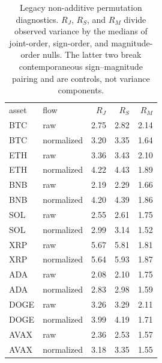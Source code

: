 \begin{table}[!htbp]
\caption{Legacy non-additive permutation diagnostics. $R_J$, $R_S$, and $R_M$ divide observed variance by the medians of joint-order, sign-order, and magnitude-order nulls. The latter two break contemporaneous sign--magnitude pairing and are controls, not variance components.}
\label{tab:permutation-controls}
\begin{ruledtabular}
\begin{tabular}{llrrr}
asset & flow & $R_J$ & $R_S$ & $R_M$ \\
\colrule
BTC & raw & 2.75 & 2.82 & 2.14 \\
BTC & normalized & 3.20 & 3.35 & 1.64 \\
ETH & raw & 3.36 & 3.43 & 2.10 \\
ETH & normalized & 4.22 & 4.43 & 1.89 \\
BNB & raw & 2.19 & 2.29 & 1.66 \\
BNB & normalized & 4.20 & 4.39 & 1.86 \\
SOL & raw & 2.55 & 2.61 & 1.75 \\
SOL & normalized & 2.99 & 3.14 & 1.52 \\
\colrule
XRP & raw & 5.67 & 5.81 & 1.81 \\
XRP & normalized & 5.64 & 5.93 & 1.87 \\
ADA & raw & 2.08 & 2.10 & 1.75 \\
ADA & normalized & 2.83 & 2.98 & 1.59 \\
DOGE & raw & 3.26 & 3.29 & 2.11 \\
DOGE & normalized & 3.99 & 4.19 & 1.71 \\
AVAX & raw & 2.36 & 2.53 & 1.57 \\
AVAX & normalized & 3.18 & 3.35 & 1.55 \\
\end{tabular}
\end{ruledtabular}
\end{table}
